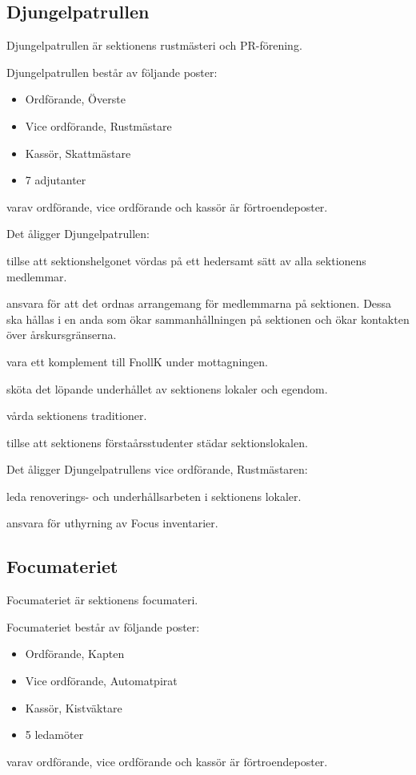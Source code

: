 \documentclass{styrdokument}
\begin{document}
\subsection{Djungelpatrullen}
\? Djungelpatrullen är sektionens rustmästeri och PR-förening.

\? Djungelpatrullen består av följande poster:
\begin{itemize}
    \item Ordförande, Överste
	\item Vice ordförande, Rustmästare
	\item Kassör, Skattmästare
	\item 7 adjutanter
\end{itemize}
varav ordförande, vice ordförande och kassör är förtroendeposter.

\? Det åligger Djungelpatrullen:
\begin{aligganden}
    \item tillse att sektionshelgonet vördas på ett hedersamt sätt av alla sektionens medlemmar.   
    \item ansvara för att det ordnas arrangemang för medlemmarna på sektionen.
        Dessa ska hållas i en anda som ökar sammanhållningen på sektionen och ökar kontakten över årskursgränserna.
    \item vara ett komplement till FnollK under mottagningen. 
    \item sköta det löpande underhållet av sektionens lokaler och egendom.
    \item vårda sektionens traditioner.
    \item tillse att sektionens förstaårsstudenter städar sektionslokalen.
\end{aligganden}

\? Det åligger Djungelpatrullens vice ordförande, Rustmästaren:
\begin{aligganden}
    \item leda renoverings- och underhållsarbeten i sektionens lokaler.
    \item ansvara för uthyrning av Focus inventarier.
\end{aligganden}

\subsection{Focumateriet}
\? Focumateriet är sektionens focumateri.

\? Focumateriet består av följande poster:
\begin{itemize}
    \item Ordförande, Kapten
	\item Vice ordförande, Automatpirat
	\item Kassör, Kistväktare
	\item 5 ledamöter
\end{itemize}
varav ordförande, vice ordförande och kassör är förtroendeposter.
\end{document}
